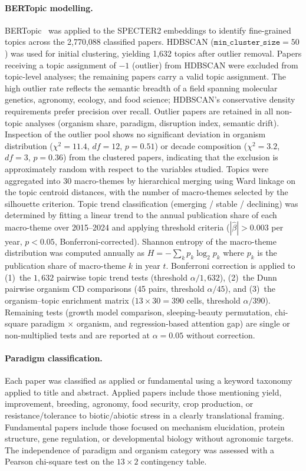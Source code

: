 \paragraph{BERTopic modelling.}
BERTopic~\cite{grootendorst2022bertopic} was applied to the SPECTER2 embeddings to
identify fine-grained topics across the 2,770,088 classified papers.
HDBSCAN ($\mathtt{min\_cluster\_size} = 50$) was used for initial clustering,
yielding 1,632 topics after outlier removal.
Papers receiving a topic assignment of $-1$ (outlier) from HDBSCAN were
excluded from topic-level analyses; the remaining papers carry a valid topic
assignment.
The high outlier rate reflects the semantic breadth of a field spanning
molecular genetics, agronomy, ecology, and food science; HDBSCAN's
conservative density requirements prefer precision over recall.
Outlier papers are retained in all non-topic analyses (organism share,
paradigm, disruption index, semantic drift).
Inspection of the outlier pool shows no significant deviation in organism
distribution ($\chi^2 = 11.4$, $df = 12$, $p = 0.51$) or decade composition
($\chi^2 = 3.2$, $df = 3$, $p = 0.36$) from the clustered papers, indicating
that the exclusion is approximately random with respect to the variables
studied.
Topics were aggregated into 30 macro-themes by hierarchical merging using
Ward linkage on the topic centroid distances, with the number of macro-themes
selected by the silhouette criterion.
Topic trend classification (emerging / stable / declining) was determined by
fitting a linear trend to the annual publication share of each macro-theme
over 2015--2024 and applying threshold criteria ($|\hat{\beta}| > 0.003$
per year, $p < 0.05$, Bonferroni-corrected).
Shannon entropy of the macro-theme distribution was computed annually as
$H = -\sum_k p_k \log_2 p_k$ where $p_k$ is the publication share of
macro-theme $k$ in year $t$.
Bonferroni correction is applied to (1)~the $1{,}632$ pairwise topic
trend tests (threshold $\alpha / 1{,}632$), (2)~the Dunn pairwise
organism CD comparisons (45 pairs, threshold $\alpha / 45$), and
(3)~the organism--topic enrichment matrix ($13 \times 30 = 390$ cells,
threshold $\alpha / 390$).
Remaining tests (growth model comparison, sleeping-beauty permutation,
chi-square paradigm $\times$ organism, and regression-based attention gap)
are single or non-multiplied tests and are reported at $\alpha = 0.05$
without correction.

\paragraph{Paradigm classification.}
Each paper was classified as applied or fundamental using a keyword
taxonomy applied to title and abstract.
Applied papers include those mentioning yield, improvement, breeding,
agronomy, food security, crop production, or resistance/tolerance to
biotic/abiotic stress in a clearly translational framing.
Fundamental papers include those focused on mechanism elucidation,
protein structure, gene regulation, or developmental biology without
agronomic targets.
The independence of paradigm and organism category was assessed with a
Pearson chi-square test on the $13 \times 2$ contingency table.

